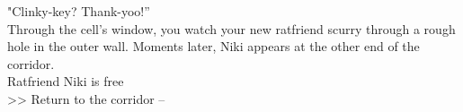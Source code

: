 "Clinky-key? Thank-yoo!”\\

Through the cell’s window, you watch your new ratfriend scurry through a rough hole in the outer wall. Moments later, Niki appears at the other end of the corridor.\\

 Ratfriend Niki is free\\
>> Return to the corridor -- 